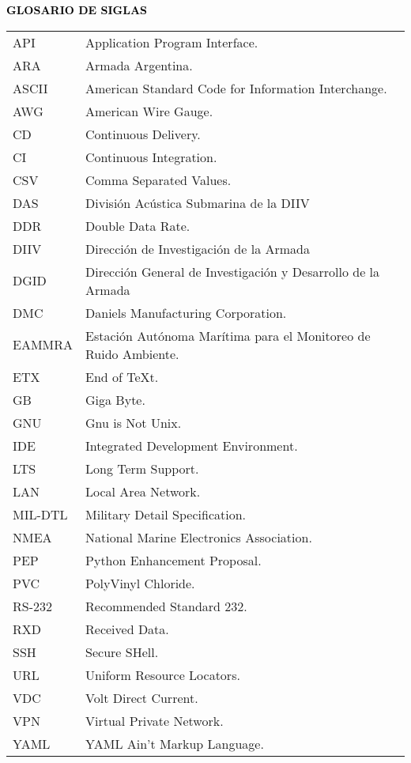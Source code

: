 
\begin{center}
	\Large\textbf{{\textcolor{black}{GLOSARIO DE SIGLAS}}}
\end{center}
\begin{tabular}{l p{12cm}}
	API		&Application Program Interface.\\		
	ARA		&Armada Argentina.\\
	ASCII	&American Standard Code for Information Interchange.\\
	AWG		&American Wire Gauge.\\
	CD		&Continuous Delivery.\\
	CI		&Continuous Integration.\\
	CSV		&Comma Separated Values.\\	
	DAS		&División Acústica Submarina de la DIIV\\
	DDR		&Double Data Rate.\\
	DIIV		&Dirección de Investigación de la Armada\\
	DGID		&Dirección General de Investigación y Desarrollo de la Armada\\
	DMC		&Daniels Manufacturing Corporation.\\
	EAMMRA	&Estación Autónoma Marítima para el Monitoreo de Ruido Ambiente.\\
	ETX		&End of TeXt.\\
	GB		&Giga Byte.\\	
	GNU		&Gnu is Not Unix.\\
	IDE		&Integrated Development Environment.\\
	LTS		&Long Term Support.\\
	LAN		&Local Area Network.\\
	MIL-DTL	&Military Detail Specification.\\
    NMEA		&National Marine Electronics Association.\\	
	PEP		&Python Enhancement Proposal.\\
	PVC		&PolyVinyl Chloride.\\	
	RS-232	&Recommended Standard 232.\\
	RXD		&Received Data.\\
	SSH		&Secure SHell.\\	
	URL		&Uniform Resource Locators.\\
	VDC		&Volt Direct Current.\\	
	VPN		&Virtual Private Network.\\
	YAML		&YAML Ain't Markup Language.\\
\end{tabular}

\clearpage
